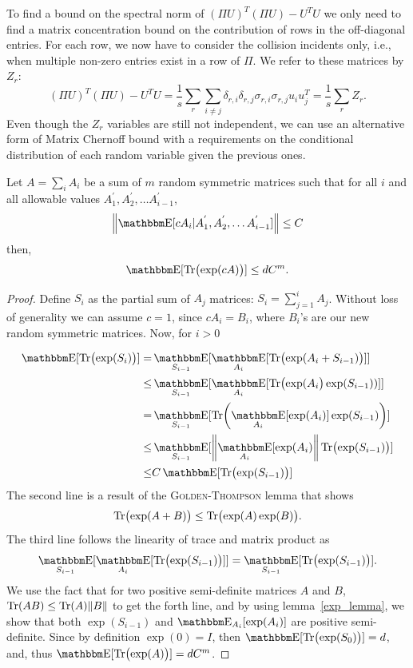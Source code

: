 To find a bound on the spectral norm of $(\Pi U)^T (\Pi U) - U^TU$ we only need to find a matrix concentration bound on the contribution of rows in the off-diagonal entries. For each row, we now have to consider the collision incidents only, i.e., when multiple non-zero entries exist in a row of $\Pi$. We refer to these matrices by $Z_r$:
\begin{equation}
    (\Pi U)^T (\Pi U) - U^TU = \frac{1}{s} \sum_r \sum_{i \neq j} \delta_{r, i} \delta_{r, j} \sigma_{r,i} \sigma_{r, j} u_i u_j ^ T = \frac{1}{s} \sum_r {Z_r}.
\end{equation}
Even though the $Z_r$ variables are still not independent, we can use an alternative form of Matrix Chernoff bound with a
requirements on the conditional distribution of each random variable given the previous ones.
\begin{lemma}
\label{lemma_2}
    Let $A = \sum_i A_i$ be a sum of $m$ random symmetric matrices such that for all $i$ and all allowable values $A_1^{'}, A_2^{'}, \dots A_{i - 1}^{'}$,
    $$
        \norm{\av [cA_i | A_1^{'}, A_2^{'}, \dots A_{i - 1}^{'}]} \leq C  
    $$
then, 
$$
\av[\tr{\exp(cA)}] \leq d C^m.
$$
\end{lemma}

\begin{proof}

Define $S_{i}$ as the partial sum of $A_j$ matrices: $S_{i} = \sum_{j = 1}^{i}A_j$. Without loss of generality we can assume $c = 1$, since $cA_i = B_i$, where $B_i$'s are our new random symmetric matrices. Now, for $i > 0$

\begin{align*}
    \av[\tr{\exp(S_i)}] = &\av_{S_{i-1}}[\av_{A_i}[\tr{\exp(A_i + S_{i-1})}]] \\
    \leq & \av_{S_{i-1}}[\av_{A_i}[\tr{\exp(A_i}\exp(S_{i-1}))]] \\
    = & \av_{S_{i-1}}[\tr{\av_{A_i}[\exp(A_i)]\exp(S_{i-1})}] \\
    \leq & \av_{S_{i-1}}[\norm{\av_{A_i}[\exp(A_i)} \tr{\exp(S_{i-1})}] \\
    \leq & C\av[\tr{\exp(S_{i - 1})}]
\end{align*}
The second line is a result of the \textsc{Golden-Thompson} lemma that shows $$\tr{\exp(A + B)} \leq \tr{\exp(A)\exp(B)}.$$ 
The third line follows the linearity of trace and matrix product as $$\av_{S_{i - 1}}[\av_{A_i}[\tr{\exp(S_{i - 1})}]] = \av_{S_{i - 1}}[\tr{\exp(S_{i - 1})}].$$ 
We use the fact that for two positive semi-definite matrices $A$ and $B$, $\tr{A B} \leq \tr{A} \norm{B}$ to get the forth line, and by using lemma~\ref{exp_lemma}, we show that both $\exp(S_{i - 1})$ and $\av_{A_{i}}[\exp(A_i)]$ are positive semi-definite. Since by definition $\exp(0) = I$, then $\av[\tr{\exp(S_0)}] = d$, and, thus $\av[\tr{\exp(A)}] = dC^m$.
\end{proof}


